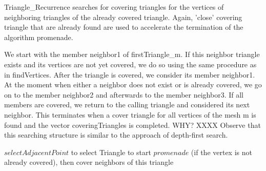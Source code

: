 \documentclass[10pt]{article}
\begin{document}
{\ttfamily Triangle\_Recurrence} searches for covering triangles for the vertices of neighboring triangles of the already covered triangle. Again, 'close' covering triangle that are already found are used to accelerate the termination of the algorithm {\ttfamily promenade}.

We start with the member {\ttfamily neighbor1} of {\ttfamily firstTriangle\_m}. If this neighbor triangle exists and its vertices are not yet covered, we do so using the same procedure as in {\ttfamily findVertices}. After the triangle is covered, we consider its member {\ttfamily neighbor1}. At the moment when either a neighbor does not exist or is already covered, we go on to the member {\ttfamily neighbor2} and afterwards to the member {\ttfamily neighbor3}. If all members are covered, we return to the calling triangle and considered its next neighbor. This terminates when a cover triangle for all vertices of the mesh {\ttfamily m} is found and the vector {\ttfamily coveringTriangles} is completed. WHY? XXXX Observe that this searching structure is similar to the approach of depth-first search. 

$selectAdjacentPoint$ to select Triangle to start $promenade$ (if the vertex is not already covered), then cover neighbors of this triangle
\end{document}
